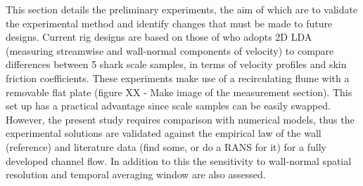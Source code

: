 \documentclass[12pt,oneside,a4paper]{article}
\begin{document}
This section details the preliminary experiments, the aim of which are to validate the experimental method and identify changes that must be made to future designs. Current rig designs are based on those of \cite{fletcher2014phd} who adopts 2D LDA (measuring streamwise and wall-normal components of velocity) to compare differences between 5 shark scale samples, in terms of velocity profiles and skin friction coefficients. These experiments make use of a recirculating flume with a removable flat plate (figure XX - Make image of the measurement section). This set up has a practical advantage since scale samples can be easily swapped. However, the present study requires comparison with numerical models, thus the experimental solutions are validated against the empirical law of the wall (reference) and literature data (find some, or do a RANS for it) for a fully developed channel flow. In addition to this the sensitivity to wall-normal spatial resolution and temporal averaging window are also assessed.
\end{document}
